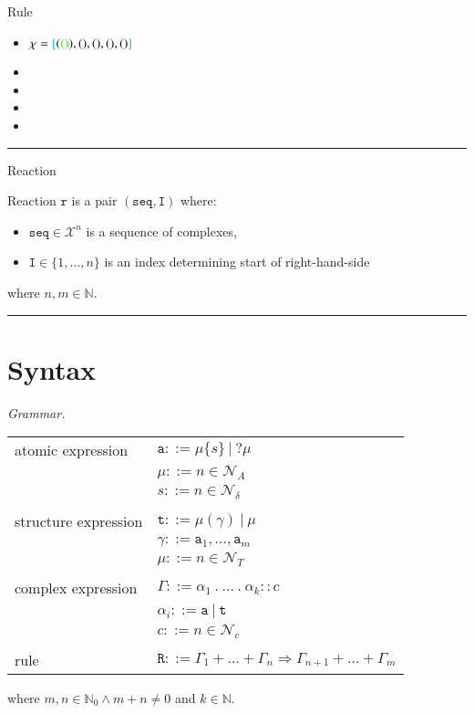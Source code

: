 \documentclass{elsarticle}
\begin{document}
\begin{example}{Rule}

\begin{itemize}
\item $\chi = \textcolor{cyan}{[} (\textcolor{green}{(}  \textcolor{green}{)}), (), (), (), () \textcolor{cyan}{]}$
\item 
\item 
\item 
\item 
\end{itemize}
\end{example}

\noindent\rule{\textwidth}{1pt}

\begin{definition}{Reaction}

Reaction $\mathtt{r}$ is a pair $(\mathtt{seq}, \mathtt{I})$ where:

\begin{itemize}
\item $\mathtt{seq} \in \mathcal{X}^n$ is a sequence of complexes,
\item $\mathtt{I} \in \{ 1, \ldots, n \}$ is an index determining start of right-hand-side
\end{itemize}

where $n, m \in \mathbb{N}$.
\end{definition}

\noindent\rule{\textwidth}{2pt}

\section{Syntax}

\begin{definition}
\textit{Grammar.}

\begin{center}
\begin{tabular}{ l l }
atomic expression & $\mathtt{a} ::= \mu\{s\} ~|~ ? \mu$\\
 & $\mu ::= n \in \mathcal{N}_{A}$ \\
 & $s ::= n \in \mathcal{N}_{\delta}$\\
 & \\
structure expression & $\mathtt{t} ::= \mu(\gamma) ~|~ \mu$\\
 & $\gamma ::= \mathtt{a}_1, \ldots, \mathtt{a}_m$ \\
 & $\mu ::= n \in \mathcal{N}_{T}$\\
 & \\
complex expression & $\Gamma ::= \alpha_1~.~\ldots~.~\alpha_k :: c$\\
 & $\alpha_i ::= \mathtt{a} ~|~ \mathtt{t}$\\
 & $c ::= n \in \mathcal{N}_{c}$\\
 & \\
rule & $\mathtt{R} ::= \Gamma_1 + \ldots + \Gamma_n \Rightarrow \Gamma_{n+1} + \ldots + \Gamma_m $
\end{tabular}

\end{center}
where $m,n \in \mathbb{N}_0 \wedge m + n \neq 0$ and $k \in \mathbb{N}$.
\end{definition}
\end{document}
